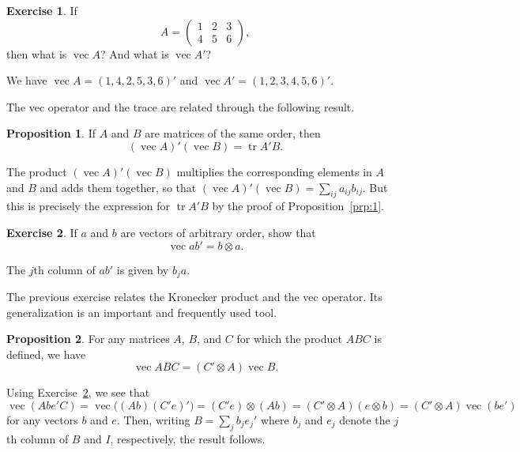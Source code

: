 \documentclass[12pt,a4paper]{article}
\makeatletter
\theoremstyle{definition}
\newtheorem{proposition}{Proposition}
\newtheorem{exercise}{Exercise}
\renewenvironment{proof}[1][\proofname]{\par
  \pushQED{\qed}%
  \normalfont \topsep6\p@\@plus6\p@\relax
  \trivlist
  \item[\hskip\labelsep\bfseries #1\@addpunct{.}]\ignorespaces
}{%
  \popQED\endtrivlist\@endpefalse
}
\newenvironment{solution}{%
  \begin{proof}[Solution]%
}{%
  \end{proof}%
}
\DeclareMathOperator{\tr}{tr}
\DeclareMathOperator{\avec}{vec}
\makeatother
\begin{document}
\begin{exercise}\label{exer:2}
If
\[
A = \begin{pmatrix} 1 & 2 & 3 \\ 4 & 5 & 6 \end{pmatrix},
\]
then what is $\avec A$? And what is $\avec A'$?
\end{exercise}

\begin{solution}
We have $\avec A = (1, 4, 2, 5, 3, 6)'$ and $\avec A' = (1, 2, 3, 4, 5, 6)'$. %
\end{solution}

The vec operator and the trace are related through the following result. %

\begin{proposition}\label{prp:5}
If $A$ and $B$ are matrices of the same order, then
\[
(\avec A)'(\avec B) = \tr A'B.
\]
\end{proposition}

\begin{proof}
The product $(\avec A)'(\avec B)$ multiplies the corresponding elements in $A$ and $B$ and adds them together, so that $(\avec A)'(\avec B) = \sum_{ij} a_{ij} b_{ij}$. But this is precisely the expression for $\tr A'B$ by the proof of Proposition~\ref{prp:1}. %
\end{proof}

\begin{exercise}\label{exer:3}
If $a$ and $b$ are vectors of arbitrary order, show that
\[
\avec ab' = b \otimes a.
\]
\end{exercise}

\begin{solution}
The $j$th column of $ab'$ is given by $b_j a$. %
\end{solution}

The previous exercise relates the Kronecker product and the vec operator. Its generalization is an important and frequently used tool. %

\begin{proposition}\label{prp:6}
For any matrices $A$, $B$, and $C$ for which the product $ABC$ is defined, we have
\[
\avec ABC = (C' \otimes A) \avec B.
\]
\end{proposition}

\begin{proof}
Using Exercise~\ref{exer:3}, we see that
\[
\avec(Abe'C) = \avec\bigl((Ab)(C'e)'\bigr) = (C'e) \otimes (Ab)
= (C' \otimes A)(e \otimes b) = (C' \otimes A) \avec(be')
\]
for any vectors $b$ and $e$. Then, writing $B = \sum_j b_j e_j'$ where $b_j$ and $e_j$ denote the $j$th column of $B$ and $I$, respectively, the result follows. %
\end{proof}
\end{document}

